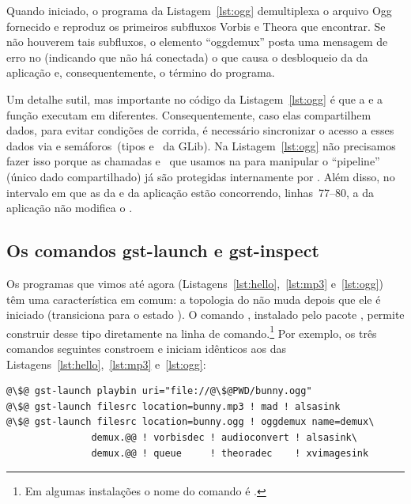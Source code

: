 \documentclass{SBCbookchapter}
\begin{document}
Quando iniciado, o programa da Listagem~\ref{lst:ogg} demultiplexa o arquivo
Ogg fornecido e reproduz os primeiros subfluxos Vorbis e Theora que
encontrar.  Se não houverem tais subfluxos, o elemento ``oggdemux'' posta
uma mensagem de erro no  (indicando que não há 
conectada) o que causa o desbloqueio da  da aplicação e,
consequentemente, o término do programa.

Um detalhe sutil, mas importante no código da Listagem~\ref{lst:ogg} é que a
  e a função  executam em 
diferentes.  Consequentemente, caso elas compartilhem dados, para evitar
condições de corrida, é necessário sincronizar o acesso a esses dados via
 e semáforos~(tipos  e~ da GLib).  Na
Listagem~\ref{lst:ogg} não precisamos fazer isso porque as chamadas
 e~ que usamos na  para
manipular o ``pipeline'' (único dado compartilhado) já são protegidas
internamente por .  Além disso, no intervalo em que as
 da  e da aplicação estão concorrendo,
linhas~77--80, a  da aplicação não modifica o .


\subsection*{Os comandos gst-launch e gst-inspect}

Os programas que vimos até agora (Listagens~\ref{lst:hello},~\ref{lst:mp3}
e~\ref{lst:ogg}) têm uma característica em comum: a topologia do
 não muda depois que ele é iniciado (transiciona para o estado
).  O comando , instalado pelo pacote
, permite construir  desse tipo diretamente na
linha de comando.\footnote{Em algumas instalações o nome do comando é
  .}  Por exemplo, os três comandos seguintes constroem e
iniciam  idênticos aos das
Listagens~\ref{lst:hello},~\ref{lst:mp3} e~\ref{lst:ogg}:
\begin{lstlisting}[style=command]
@\$@ gst-launch playbin uri="file://@\$@PWD/bunny.ogg"
@\$@ gst-launch filesrc location=bunny.mp3 ! mad ! alsasink
@\$@ gst-launch filesrc location=bunny.ogg ! oggdemux name=demux\
               demux.@@ ! vorbisdec ! audioconvert ! alsasink\
               demux.@@ ! queue     ! theoradec    ! xvimagesink
\end{lstlisting}
\end{document}
